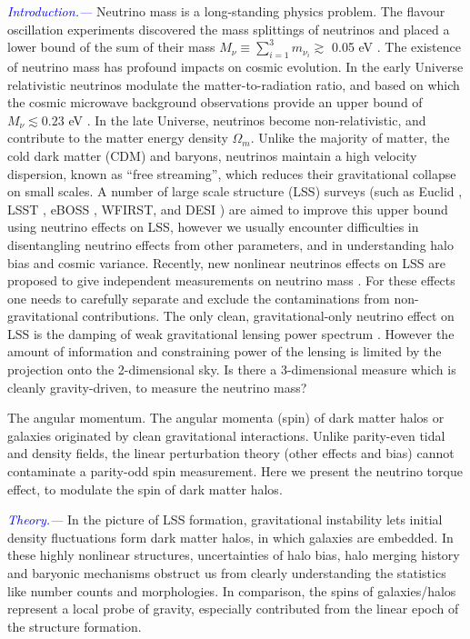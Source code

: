 \documentclass[aps,prd,twocolumn,amsmath,amssymb,amsfont,superscriptaddress]{revtex4-1}
\newcommand{\tcb}{\textcolor{blue}}
\begin{document}
\tcb{\textit{Introduction.---}}
Neutrino mass is a long-standing physics problem. 
The flavour oscillation experiments \citep{2002PhRvL..89a1301A} discovered the mass 
splittings of neutrinos and placed a lower bound of the sum of their mass 
$M_\nu \equiv \sum_{i=1}^3 m_{\nu_i} \gtrsim$ 0.05 eV \citep{2014ChPhC..38i0001O}. 
The existence of neutrino mass has profound impacts on cosmic evolution. 
In the early Universe relativistic neutrinos modulate the matter-to-radiation ratio, 
and based on which the cosmic microwave background observations provide an 
upper bound of $M_\nu\lesssim 0.23$ eV \citep{2016A&A...594A..13P}. 
In the late Universe, neutrinos become non-relativistic, 
and contribute to the matter energy density $\Omega_m$. 
Unlike the majority of matter, the cold dark matter (CDM) and baryons, 
neutrinos maintain a high velocity dispersion, 
known as ``free streaming'', which reduces their gravitational collapse on small scales. 
A number of large scale structure (LSS) surveys 
(such as Euclid \cite{2011arXiv1110.3193L},
LSST \cite{2009arXiv0912.0201L}, eBOSS \cite{2016AJ....151...44D}, WFIRST\cite{2012SPIE.8442E..1UG}, 
and DESI \cite{2015AAS...22533605E}) are aimed to improve this upper bound using neutrino effects on LSS, 
however we usually encounter difficulties in disentangling neutrino effects from other parameters, 
and in understanding halo bias and cosmic variance. 
Recently, new nonlinear neutrinos effects on LSS are proposed to give independent measurements on neutrino mass \citep{2014PhRvL.113m1301Z,2016PhRvL.116n1301Z,2017NatAs...1E.143Y}. 
For these effects one needs to carefully separate and exclude the contaminations from non-gravitational contributions. 
The only clean, gravitational-only neutrino effect on LSS is the damping of weak gravitational lensing power spectrum \citep{2016A&A...594A..13P}. 
However the amount of information and constraining power of the lensing is limited by the projection onto the 2-dimensional sky. 
Is there a 3-dimensional measure which is cleanly gravity-driven, to measure the neutrino mass?

The angular momentum. The angular momenta (spin) of dark matter halos or galaxies originated by clean gravitational interactions. 
Unlike parity-even tidal and density fields, the linear perturbation theory (other effects and bias) cannot contaminate a parity-odd spin measurement. 
Here we present the neutrino torque effect, to modulate the spin of dark matter halos.

\tcb{\textit{Theory.---}} 
In the picture of LSS formation, gravitational instability lets initial density fluctuations form dark matter halos, in which galaxies are embedded.
In these highly nonlinear structures, uncertainties of halo bias, 
halo merging history and baryonic mechanisms obstruct us from clearly 
understanding the statistics like number counts and morphologies.
In comparison, the spins of galaxies/halos represent a local probe of gravity, 
especially contributed from the linear epoch of the structure formation. 
\end{document}
